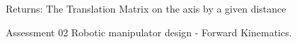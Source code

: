 \documentclass[letterpaper,10pt,english,openany,oneside]{sphinxmanual}
\begin{document}
\begin{fulllineitems}
\begin{fulllineitems}
\begin{quote}
\begin{description}
\end{description}\end{quote}

Returns: The Translation Matrix on the  axis by a given distance

\end{fulllineitems}


\end{fulllineitems}


\begin{fulllineitems}
\label{\detokenize{ForwardKinematics:Forward_Kinematics.main}}
Assessment 02 Robotic manipulator design - Forward Kinematics.

\end{fulllineitems}
\end{document}
